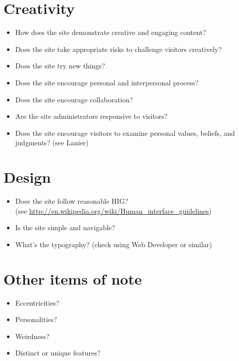 \documentclass[11pt,oneside,letterpaper]{article}
\begin{document}
\section{Creativity}
\begin{itemize}
\item How does the site demonstrate creative and engaging content?
\item Does the site take appropriate risks to challenge visitors creatively?
\item Does the site try new things?
\item Does the site encourage personal and interpersonal process?
\item Does the site encourage collaboration?
\item Are the site administrators responsive to visitors?
\item Does the site encourage visitors to examine personal values, beliefs, and judgments? (see Lanier)
\end{itemize}

\section{Design}
\begin{itemize}
\item Does the site follow reasonable HIG?\\ (see \url{http://en.wikipedia.org/wiki/Human_interface_guidelines})
\item Is the site simple and navigable?
\item What's the typography? (check using Web Developer or similar)
\end{itemize}

\section{Other items of note}
\begin{itemize}
\item Eccentricities?
\item Personalities?
\item Weirdness?
\item Distinct or unique features?
\end{itemize}
\end{document}

